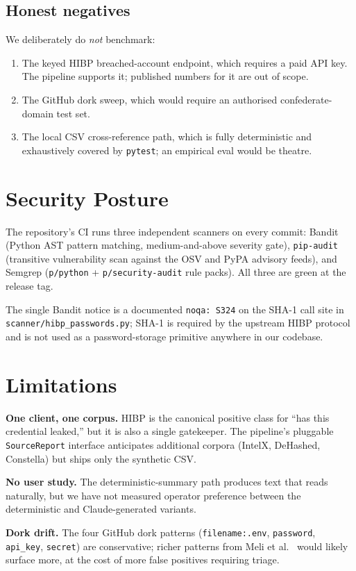 \documentclass[conference]{IEEEtran}
\begin{document}
\subsection{Honest negatives}
We deliberately do \emph{not} benchmark:
\begin{enumerate}
  \item The keyed HIBP breached-account endpoint, which requires a
        paid API key. The pipeline supports it; published numbers
        for it are out of scope.
  \item The GitHub dork sweep, which would require an authorised
        confederate-domain test set.
  \item The local CSV cross-reference path, which is fully
        deterministic and exhaustively covered by \texttt{pytest};
        an empirical eval would be theatre.
\end{enumerate}

\section{Security Posture}
The repository's CI runs three independent scanners on every commit:
Bandit (Python AST pattern matching, medium-and-above severity gate),
\texttt{pip-audit} (transitive vulnerability scan against the OSV and
PyPA advisory feeds), and Semgrep (\texttt{p/python} +
\texttt{p/security-audit} rule packs). All three are green at the
release tag.

The single Bandit notice is a documented \texttt{noqa: S324} on the
SHA-1 call site in \texttt{scanner/hibp\_passwords.py}; SHA-1 is
required by the upstream HIBP protocol and is not used as a
password-storage primitive anywhere in our codebase.

\section{Limitations}
\textbf{One client, one corpus.} HIBP is the canonical positive class
for ``has this credential leaked,'' but it is also a single
gatekeeper. The pipeline's pluggable
\texttt{SourceReport} interface anticipates additional corpora
(IntelX, DeHashed, Constella) but ships only the synthetic CSV.

\textbf{No user study.} The deterministic-summary path produces text
that reads naturally, but we have not measured operator preference
between the deterministic and Claude-generated variants.

\textbf{Dork drift.} The four GitHub dork patterns
(\texttt{filename:.env}, \texttt{password}, \texttt{api\_key},
\texttt{secret}) are conservative; richer patterns from
Meli et al.~\cite{meli2019gitleaks} would likely surface more, at
the cost of more false positives requiring triage.
\end{document}
